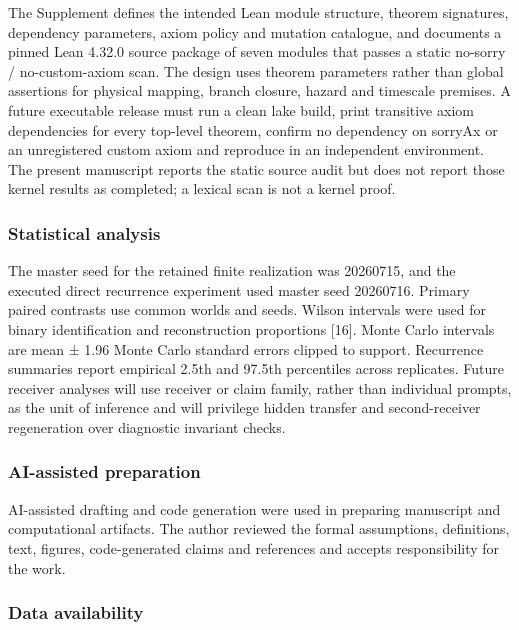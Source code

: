 The Supplement defines the intended Lean module structure, theorem
signatures, dependency parameters, axiom policy and mutation catalogue,
and documents a pinned Lean 4.32.0 source package of seven modules that
passes a static no-sorry / no-custom-axiom scan. The design uses theorem
parameters rather than global assertions for physical mapping, branch
closure, hazard and timescale premises. A future executable release must
run a clean lake build, print transitive axiom dependencies for every
top-level theorem, confirm no dependency on sorryAx or an unregistered
custom axiom and reproduce in an independent environment. The present
manuscript reports the static source audit but does not report those
kernel results as completed; a lexical scan is not a kernel proof.

\hypertarget{statistical-analysis}{%
\subsubsection{Statistical analysis}\label{statistical-analysis}}

The master seed for the retained finite realization was 20260715, and
the executed direct recurrence experiment used master seed 20260716.
Primary paired contrasts use common worlds and seeds. Wilson intervals
were used for binary identification and reconstruction proportions
{[}16{]}. Monte Carlo intervals are mean ± 1.96 Monte Carlo standard
errors clipped to support. Recurrence summaries report empirical 2.5th
and 97.5th percentiles across replicates. Future receiver analyses will
use receiver or claim family, rather than individual prompts, as the
unit of inference and will privilege hidden transfer and second-receiver
regeneration over diagnostic invariant checks.

\hypertarget{ai-assisted-preparation}{%
\subsubsection{AI-assisted preparation}\label{ai-assisted-preparation}}

AI-assisted drafting and code generation were used in preparing
manuscript and computational artifacts. The author reviewed the formal
assumptions, definitions, text, figures, code-generated claims and
references and accepts responsibility for the work.

\hypertarget{data-availability}{%
\subsubsection{Data availability}\label{data-availability}}

